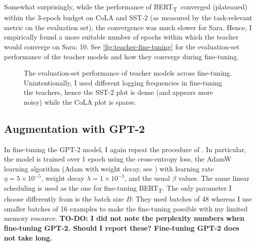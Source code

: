 \documentclass[bsc,frontabs,twoside,singlespacing,parskip,deptreport]{infthesis}
\def\BERTT{BERT\textsubscript{T}}
\begin{document}
{{{      Somewhat surprisingly, while the performance of \BERTT~converged (plateaued) within the 3-epoch budget on CoLA and SST-2 (as measured by the task-relevant metric on the evaluation set), the convergence was much slower for Sara. Hence, I empirically found a more suitable number of epochs within which the teacher would converge on Sara: 10. See \autoref{fig:teacher-fine-tuning} for the evaluation-set performance of the teacher models and how they converge during fine-tuning.
      \begin{figure}[h!t]
        \centering
        \caption{The evaluation-set performance of teacher models across fine-tuning. Unintentionally, I used different logging frequencies in fine-tuning the teachers, hence the SST-2 plot is dense (and appears more noisy) while the CoLA plot is sparse.}
        \label{fig:teacher-fine-tuning}
      \end{figure}
    }

    \subsection{Augmentation with GPT-2}{
      In fine-tuning the GPT-2 model, I again repeat the procedure of \citeauthor{Tang_2019b}. In particular, the model is trained over 1 epoch using the cross-entropy loss, the AdamW learning algorithm (Adam with weight decay, see \citet{Loshchilov_2019}) with learning rate $\eta=5\times10^{-5}$, weight decay $\lambda=1\times10^{-3}$, and the usual $\beta$ values. The same linear scheduling is used as the one for fine-tuning \BERTT. The only parameter I choose differently from \citeauthor{Tang_2019b} is the batch size $B$: They used batches of 48 whereas I use smaller batches of 16 examples to make the fine-tuning possible with my limited memory resource.
      \textbf{TO-DO: I did not note the perplexity numbers when fine-tuning GPT-2. Should I report these? Fine-tuning GPT-2 does not take long.}
    }

}}
\end{document}
